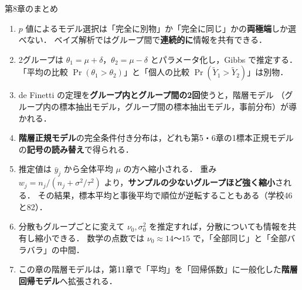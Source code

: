 \documentclass[lualatex,ja=standard,a4paper,12pt]{bxjsarticle}
\begin{document}
\begin{thmbox}{第8章のまとめ}
\begin{enumerate}
  \item $p$ 値によるモデル選択は「完全に別物」か「完全に同じ」かの\textbf{両極端}しか選べない．
        ベイズ解析ではグループ間で\textbf{連続的に}情報を共有できる．

  \item 2グループは $\theta_1 = \mu + \delta$，$\theta_2 = \mu - \delta$ とパラメータ化し，Gibbs で推定する．
        「平均の比較 $\Pr(\theta_1 > \theta_2)$」と「個人の比較 $\Pr(\tilde{Y}_1 > \tilde{Y}_2)$」は別物．

  \item de Finetti の定理を\textbf{グループ内とグループ間の2回}使うと，階層モデル
        （グループ内の標本抽出モデル，グループ間の標本抽出モデル，事前分布）が導かれる．

  \item \textbf{階層正規モデル}の完全条件付き分布は，どれも第5・6章の1標本正規モデルの\textbf{記号の読み替え}で得られる．

  \item 推定値は $\bar{y}_j$ から全体平均 $\mu$ の方へ縮小される．
        重み $w_j = n_j/(n_j + \sigma^2/\tau^2)$ より，\textbf{サンプルの少ないグループほど強く縮小}される．
        その結果，標本平均と事後平均で順位が逆転することもある（学校46と82）．

  \item 分散もグループごとに変えて $\nu_0, \sigma_0^2$ を推定すれば，分散についても情報を共有し縮小できる．
        数学の点数では $\nu_0 \approx 14$〜$15$ で，「全部同じ」と「全部バラバラ」の中間．

  \item この章の階層モデルは，第11章で「平均」を「回帰係数」に一般化した\textbf{階層回帰モデル}へ拡張される．
\end{enumerate}
\end{thmbox}
\end{document}
